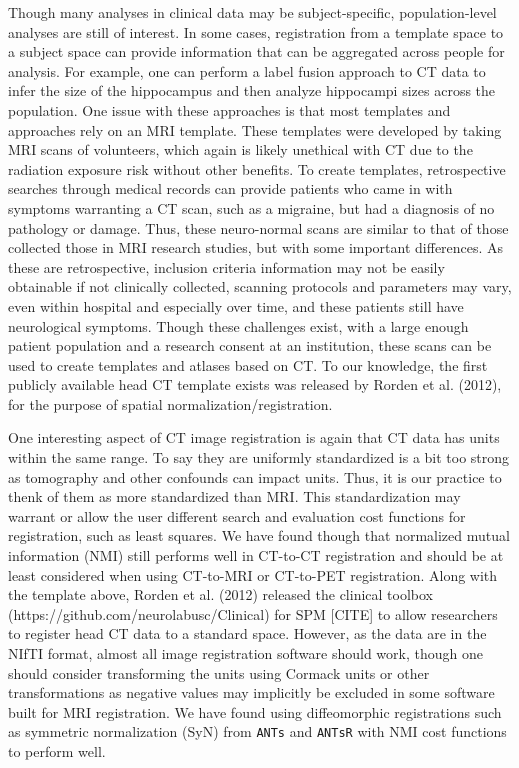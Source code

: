 \documentclass[]{elsarticle} %
\begin{document}
Though many analyses in clinical data may be subject-specific,
population-level analyses are still of interest. In some cases,
registration from a template space to a subject space can provide
information that can be aggregated across people for analysis. For
example, one can perform a label fusion approach to CT data to infer the
size of the hippocampus and then analyze hippocampi sizes across the
population. One issue with these approaches is that most templates and
approaches rely on an MRI template. These templates were developed by
taking MRI scans of volunteers, which again is likely unethical with CT
due to the radiation exposure risk without other benefits. To create
templates, retrospective searches through medical records can provide
patients who came in with symptoms warranting a CT scan, such as a
migraine, but had a diagnosis of no pathology or damage. Thus, these
neuro-normal scans are similar to that of those collected those in MRI
research studies, but with some important differences. As these are
retrospective, inclusion criteria information may not be easily
obtainable if not clinically collected, scanning protocols and
parameters may vary, even within hospital and especially over time, and
these patients still have neurological symptoms. Though these challenges
exist, with a large enough patient population and a research consent at
an institution, these scans can be used to create templates and atlases
based on CT. To our knowledge, the first publicly available head CT
template exists was released by Rorden et al. (2012), for the purpose of
spatial normalization/registration.

One interesting aspect of CT image registration is again that CT data
has units within the same range. To say they are uniformly standardized
is a bit too strong as tomography and other confounds can impact units.
Thus, it is our practice to thenk of them as more standardized than MRI.
This standardization may warrant or allow the user different search and
evaluation cost functions for registration, such as least squares. We
have found though that normalized mutual information (NMI) still
performs well in CT-to-CT registration and should be at least considered
when using CT-to-MRI or CT-to-PET registration. Along with the template
above, Rorden et al. (2012) released the clinical toolbox
(https://github.com/neurolabusc/Clinical) for SPM {[}CITE{]} to allow
researchers to register head CT data to a standard space. However, as
the data are in the NIfTI format, almost all image registration software
should work, though one should consider transforming the units using
Cormack units or other transformations as negative values may implicitly
be excluded in some software built for MRI registration. We have found
using diffeomorphic registrations such as symmetric normalization (SyN)
from \texttt{ANTs} and \texttt{ANTsR} with NMI cost functions to perform
well.
\end{document}
